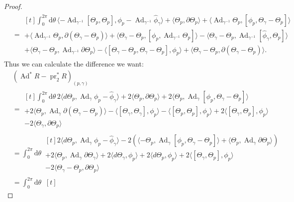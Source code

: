 \documentclass[12pt]{amsart}
\DeclareMathOperator{\Ad}{Ad}
\DeclareMathOperator{\pr}{pr}
\theoremstyle{plain}
\theoremstyle{definition}
\theoremstyle{remark}
\numberwithin{equation}{section}
\newcommand{\<}{\langle}
\renewcommand{\>}{\rangle}
\newcommand{\intSone}{\int_{0}^{2\pi}\mathrm{d}\theta\,}
\newcommand{\phihat}{\widehat{\phi}}
\begin{document}
\begin{proof}
\begin{align*}
  &=\begin{multlined}[t]
    \intSone \langle -\Ad_{\gamma^{-1}}[\Theta_p,\Theta_p],\phi_p-\Ad_{\gamma^{-1}}\phihat_\gamma\rangle + \langle\Theta_p,\partial\Theta_p\rangle 
    + \langle \Ad_{\gamma^{-1}}\Theta_p,[\phi_p,\Theta_\gamma-\Theta_p]\rangle\\
    +\langle \Ad_{\gamma^{-1}}\Theta_p,\partial(\Theta_\gamma-\Theta_p) \rangle + \langle\Theta_\gamma-\Theta_p,[\phi_p,\Ad_{\gamma^{-1}}\Theta_p]\rangle
    - \langle \Theta_\gamma-\Theta_p,\Ad_{\gamma^{-1}}[\phihat_\gamma,\Theta_p]\rangle\\
    +\langle \Theta_\gamma-\Theta_p,\Ad_{\gamma^{-1}}\partial\Theta_p\rangle - \langle [\Theta_\gamma-\Theta_p,\Theta_\gamma-\Theta_p],\phi_p\rangle + \langle \Theta_\gamma-\Theta_p,\partial(\Theta_\gamma-\Theta_p)\rangle.
  \end{multlined}
\end{align*}
Thus we can calculate the difference we want:
\begin{align*}
&(\Ad^*R - \pr_2^*R)_{(p,\gamma)} \\
& = 
  \begin{multlined}[t]
    \intSone 2\langle d\Theta_p,\Ad_\gamma\phi_p - \phihat_\gamma\rangle + 2\langle \Theta_p,\partial\Theta_p\rangle + 2\langle \Theta_p,\Ad_\gamma[\phi_p,\Theta_\gamma-\Theta_p]\rangle\\
    +2\langle \Theta_p ,\Ad_\gamma\partial(\Theta_\gamma - \Theta_p)\rangle
    - \langle [\Theta_\gamma,\Theta_\gamma],\phi_p\rangle 
    -\langle [\Theta_p,\Theta_p],\phi_p\rangle
    +2\langle [\Theta_\gamma,\Theta_p],\phi_p\rangle \\
    - 2\langle\Theta_\gamma,\partial\Theta_p\rangle
  \end{multlined}\\
  & = \intSone
  \begin{multlined}[t]
    2\langle d\Theta_p,\Ad_\gamma\phi_p - \phihat_\gamma\rangle -
    2\left(\langle-\Theta_p,\Ad_\gamma[\phi_p,\Theta_\gamma-\Theta_p]\rangle + \langle\Theta_p,\Ad_\gamma\partial\Theta_p\rangle\right)\\
    +2\langle\Theta_p,\Ad_\gamma\partial\Theta_\gamma\rangle + 2\langle d\Theta_\gamma ,\phi_p\rangle + 2\langle d\Theta_p,\phi_p\rangle 
    + 2\langle[\Theta_\gamma,\Theta_p],\phi_p\rangle \\
    -2\langle \Theta_\gamma-\Theta_p,\partial\Theta_p\rangle
  \end{multlined}\\
  & = \intSone 
  \begin{multlined}[t]

\end{multlined}
\end{align*}
\end{proof}
\end{document}
